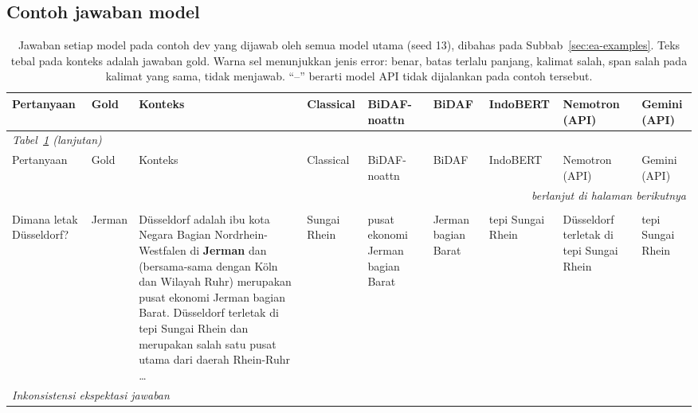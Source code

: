 \documentclass[11pt,a4paper]{article}
\begin{document}
\appendix
\begin{landscape}
\section{Contoh jawaban model}
\label{app:examples}
{\scriptsize
\setlength{\tabcolsep}{3pt}
\renewcommand{\arraystretch}{1.25}
\begin{longtable}{p{2.0cm}p{1.6cm}p{5.2cm}p{1.9cm}p{1.9cm}p{1.9cm}p{1.9cm}p{2.1cm}p{2.1cm}}
  \caption{Jawaban setiap model pada contoh dev yang dijawab oleh semua model utama (seed 13), dibahas pada
  Subbab~\ref{sec:ea-examples}. Teks tebal pada konteks adalah jawaban gold. Warna sel menunjukkan jenis error:
  \colorbox{ecorrect}{benar}, \colorbox{elong}{batas terlalu panjang}, \colorbox{ewsent}{kalimat salah},
  \colorbox{ewspan}{span salah pada kalimat yang sama}, \colorbox{enoans}{tidak menjawab}. ``--'' berarti model API tidak
  dijalankan pada contoh tersebut.}
  \label{tab:examples} \\
    \toprule
    Pertanyaan & Gold & Konteks & Classical & BiDAF-noattn & BiDAF & IndoBERT & Nemotron (API) & Gemini (API) \\
    \midrule
    \endfirsthead
    \multicolumn{9}{l}{\textit{Tabel~\ref{tab:examples} (lanjutan)}} \\
    \toprule
    Pertanyaan & Gold & Konteks & Classical & BiDAF-noattn & BiDAF & IndoBERT & Nemotron (API) & Gemini (API) \\
    \midrule
    \endhead
    \midrule
    \multicolumn{9}{r}{\textit{berlanjut di halaman berikutnya}} \\
    \endfoot
    \bottomrule
    \endlastfoot
    \multicolumn{9}{l}{\cellcolor{black!8}\textit{Lebih dari satu jawaban valid}} \\*
    Dimana letak Düsseldorf? & Jerman
      & Düsseldorf adalah ibu kota Negara Bagian Nordrhein-Westfalen di \textbf{Jerman} dan (bersama-sama dengan Köln dan Wilayah Ruhr) merupakan pusat ekonomi Jerman bagian Barat. Düsseldorf terletak di tepi Sungai Rhein dan merupakan salah satu pusat utama dari daerah Rhein-Ruhr \ldots
      & \cellcolor{ewsent}Sungai Rhein
      & \cellcolor{elong}pusat ekonomi Jerman bagian Barat
      & \cellcolor{elong}Jerman bagian Barat
      & \cellcolor{ewsent}tepi Sungai Rhein
      & \cellcolor{ewsent}Düsseldorf terletak di tepi Sungai Rhein
      & \cellcolor{ewsent}tepi Sungai Rhein \\
    \midrule
    \multicolumn{9}{l}{\cellcolor{black!8}\textit{Inkonsistensi ekspektasi jawaban}} \\*

\end{longtable}}
\end{landscape}
\end{document}
